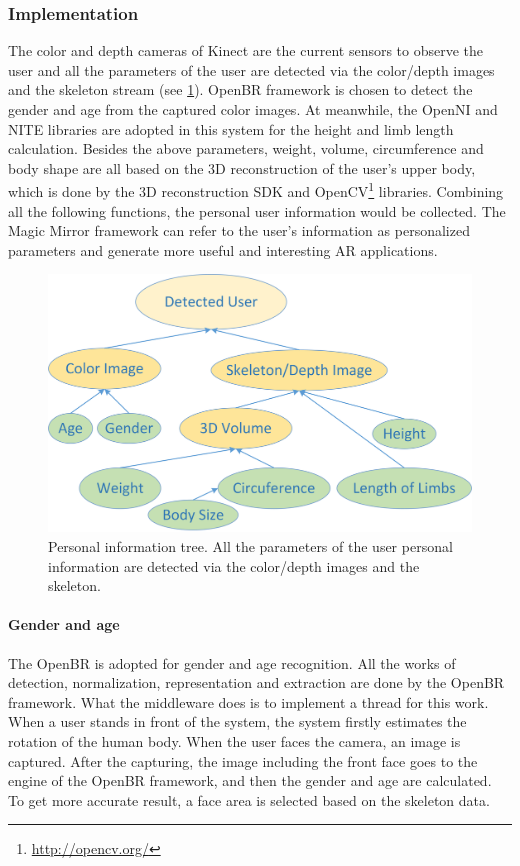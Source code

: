 \subsubsection{Implementation}
The color and depth cameras of Kinect are the current sensors to observe the user and all the parameters of the user are detected via the color/depth images and the skeleton stream (see \figurename{\ref{fig:3-PRMM:BiomatricInformation}}). OpenBR framework is chosen to detect the gender and age from the captured color images. At meanwhile, the OpenNI and NITE libraries are adopted in this system for the height and limb length calculation. Besides the above parameters, weight, volume, circumference and body shape are all based on the 3D reconstruction of the user's upper body, which is done by the 3D reconstruction SDK and OpenCV\footnote{\url{http://opencv.org/}} libraries.
Combining all the following functions, the personal user information would be collected. The Magic Mirror framework can refer to the user's information as personalized parameters and generate more useful and interesting AR applications.
\begin{figure}
	\centering
	\includegraphics[width=0.75\linewidth]{figures/3-PRMM/BiomatricInformation}
	\caption[Personal Information]{Personal information tree. All the parameters of the user personal information are detected via the color/depth images and the skeleton.}
	\label{fig:3-PRMM:BiomatricInformation}
\end{figure}

\paragraph{Gender and age}
The OpenBR is adopted for gender and age recognition. All the works of detection, normalization, representation and extraction are done by the OpenBR framework. What the middleware does is to implement a thread for this work. When a user stands in front of the system, the system firstly estimates the rotation of the human body. When the user faces the camera, an image is captured.  After the capturing, the image including the front face goes to the engine of the OpenBR framework, and then the gender and age are calculated. To get more accurate result, a face area is selected based on the skeleton data. 

